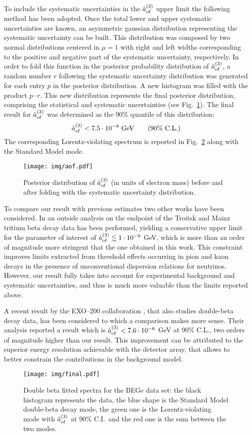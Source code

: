 To include the systematic uncertainties in the $\mathring{a}_\text{of}^{(3)}$ upper limit the following method has been adopted. Once the total lower and upper systematic uncertainties are known, an asymmetric gaussian distribution representing the systematic uncertainty can be built. This distribution was composed by two normal distributions centered in $\mu=1$ with right and left widths corresponding to the positive and negative part of the systematic uncertainty, respectively. In order to fold this function in the posterior probability distribution of $\mathring{a}_\text{of}^{(3)}$, a random number $r$ following the systematic uncertainty distribution was generated for each entry $p$ in the posterior distribution. A new histogram was filled with the product $p\cdot r$. This new distribution represents the final posterior distribution, comprising the statistical and systematic uncertainties (see Fig.~\ref{fig:aofpost}). The final result for $\mathring{a}_\text{of}^{(3)}$ was determined as the 90\% quantile of this distribution:
\begin{equation}\mathring{a}_\text{of}^{(3)}<7.5\cdot10^{-8}\ \text{GeV}\qquad(\text{90\% C.L.})\label{eq:aoffinal}\end{equation}
The corresponding Lorentz-violating spectrum is reported in Fig.~\ref{fig:final} along with the Standard Model mode.

\begin{figure}
	\centering
	\texttt{[image: img/aof.pdf]}
	\caption{Posterior distribution of $\mathring{a}_\text{of}^{(3)}$ (in units of electron mass) before and after folding with the systematic uncertainty distribution.}\label{fig:aofpost}
\end{figure}
 To compare our result with previous estimates two other works have been considered. In \cite{Diaz:2013saa} an outside analysis on the endpoint of the Troitsk and Mainz tritium beta decay data has been performed, yielding a conservative upper limit for the parameter of interest of $\mathring{a}_\text{of}^{(3)}\lesssim1\cdot10^{-9}$ GeV, which is more than an order of magnitude more stringent that the one obtained in this work. This constraint improves limits extracted from threshold effects occurring in pion and kaon decays in the presence of unconventional dispersion relations for neutrinos. However, our result fully takes into account for experimental background and systematic uncertainties, and thus is much more valuable than the limits reported above.

A recent result by the EXO--200 collaboration \cite{exo200}, that also studies double-beta decay data, has been considered to which a comparison makes more sense. Their analysis reported a result which is $\mathring{a}_\text{of}^{(3)}<7.6\cdot10^{-6}$ GeV at 90\% C.L., two orders of magnitude higher than our result. This improvement can be attributed to the superior energy resolution achievable with the {\gerda} detector array, that allows to better constrain the contributions in the background model.
\begin{figure}
	\centering
	\texttt{[image: img/final.pdf]}
	\caption{Double beta fitted spectra for the BEGe data set: the black histogram represents the data, the blue shape is the Standard Model double-beta decay mode, the green one is the Lorentz-violating mode with $\mathring{a}_\text{of}^{(3)}$ at 90\% C.I.~and the red one is the sum between the two modes.}\label{fig:final}
\end{figure}
